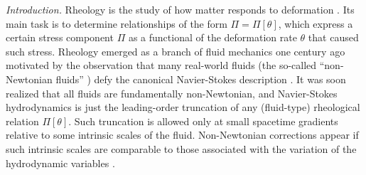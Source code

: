 \documentclass[aps,prl,noshowpacs,noshowkeys,floatfix,superscriptaddress,singlecolum,nofootinbib]{revtex4-2}
\theoremstyle{definition}
\theoremstyle{theorem}
\begin{document}
\noindent \textit{Introduction.} Rheology is the study of how matter responds to deformation \cite{malkin_book,Findley_book,Steffe_book}. Its main task is to determine relationships of the form $\Pi=\Pi[\theta]$, which express a certain stress component $\Pi$ as a functional of the deformation rate $\theta$ that caused such stress. Rheology emerged as a branch of fluid mechanics one century ago motivated by the observation that many real-world fluids (the so-called ``non-Newtonian fluids'' \cite{Tropea_book}) defy the canonical Navier-Stokes description \cite{LandauLifshitzFluids}. It was soon realized that all fluids are fundamentally non-Newtonian, and Navier-Stokes hydrodynamics is just the leading-order truncation of any (fluid-type) rheological relation $\Pi[\theta]$. Such truncation is allowed only at small spacetime gradients relative to some intrinsic scales of the fluid. Non-Newtonian corrections appear if such intrinsic scales are comparable to those associated with the variation of the hydrodynamic variables \cite{Frenkel_book,BAGGIOLI20201,BaggioliHolography}.
\end{document}
